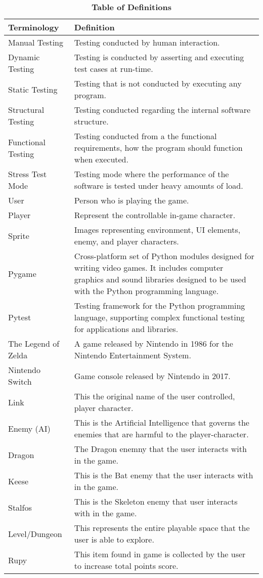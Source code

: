 \documentclass[12pt, titlepage]{article}
\begin{document}
\begin{table}[hbp]
	\caption{\textbf{Table of Definitions}} \label{Table}
	
	\begin{tabularx}{\textwidth}{p{4cm}X}
		\toprule
		\textbf{Terminology} & \textbf{Definition}\\
		\midrule
		Manual Testing & Testing conducted by human interaction.\\
		Dynamic Testing & Testing is conducted by asserting and executing test cases at run-time.\\
		Static Testing & Testing that is not conducted by executing any program.\\
		Structural Testing & Testing conducted regarding the internal software structure.\\
		Functional Testing & Testing conducted from a the functional requirements, how the program should function when executed.\\
		Stress Test Mode & Testing mode where the performance of the software is tested under heavy amounts of load.\\
		User & Person who is playing the game.\\
		Player & Represent the controllable in-game character.\\
		Sprite & Images representing environment, UI elements, enemy, and player characters.\\
		Pygame & Cross-platform set of Python modules designed for writing video games. It includes computer graphics and sound libraries designed to be used with the Python programming language.\\
		Pytest & Testing framework for the Python programming language, supporting complex functional testing for applications and libraries.\\
		The Legend of Zelda & A game released by Nintendo in 1986 for the Nintendo Entertainment System.\\
		Nintendo Switch & Game console released by Nintendo in 2017.\\
		Link & This the original name of the user controlled, player character.\\
		Enemy (AI) & This is the Artificial Intelligence that governs the enemies that are harmful to the player-character.\\
		Dragon & The Dragon enemny that the user interacts with in the game.\\
		Keese & This is the Bat enemy that the user interacts with in the game.\\
		Stalfos & This is the Skeleton enemy that user interacts with in the game.\\
		Level/Dungeon & This represents the entire playable space that the user is able to explore.\\
		Rupy & This item found in game is collected by the user to increase total points score.\\
		\bottomrule
	\end{tabularx}
\end{table}	
\newpage
\end{document}
